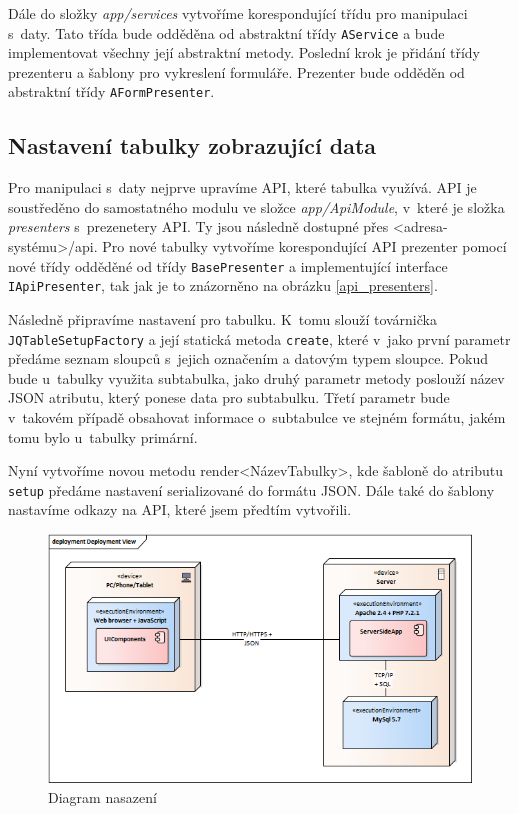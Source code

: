 \documentclass[thesis=B,czech]{FITthesis}[2012/06/26]
\begin{document}
	Dále do složky \emph{app/services} vytvoříme korespondující třídu pro manipulaci s~daty. Tato třída bude odděděna od abstraktní třídy \verb|AService| a bude implementovat všechny její abstraktní metody. Poslední krok je přidání třídy prezenteru a šablony pro vykreslení formuláře. Prezenter bude odděděn od abstraktní třídy \verb|AFormPresenter|.
\subsection{Nastavení tabulky zobrazující data}
	Pro manipulaci s~daty nejprve upravíme API, které tabulka využívá. API je soustředěno do samostatného modulu ve složce \emph{app/ApiModule}, v~které je složka \emph{presenters} s~prezenetery API. Ty jsou následně dostupné přes <adresa-systému>/api. Pro nové tabulky vytvoříme korespondující API prezenter pomocí nové třídy odděděné od třídy \verb|BasePresenter| a implementující interface \verb|IApiPresenter|, tak jak je to znázorněno na obrázku \ref{api_presenters}. 

	Následně připravíme nastavení pro tabulku. K~tomu slouží továrnička \verb|JQTableSetupFactory| a její statická metoda \verb|create|, které v~jako první parametr předáme seznam sloupců s~jejich označením a datovým typem sloupce. Pokud bude u~tabulky využita subtabulka, jako druhý parametr metody poslouží název JSON atributu, který ponese data pro subtabulku. Třetí parametr bude v~takovém případě obsahovat informace o~subtabulce ve stejném formátu, jakém tomu bylo u~tabulky primární.

	Nyní vytvoříme novou metodu render<NázevTabulky>, kde šabloně do atributu \verb|setup| předáme nastavení serializované do formátu JSON. Dále také do šablony nastavíme odkazy na API, které jsem předtím vytvořili.

\begin{figure}
	\includegraphics[width=\textwidth]{Deployment_view.png}
	\caption{Diagram nasazení}\label{deployment_view}
\end{figure}
\end{document}
